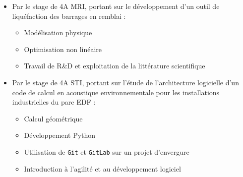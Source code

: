 \begin{itemize}
    \item Par le stage de 4A \gls{MRI}, portant sur le développement d'un outil de liquéfaction des barrages en remblai :
    \begin{itemize}
        \item Modélisation physique
        \item Optimisation non linéaire
        \item Travail de R\&D et exploitation de la littérature scientifique
    \end{itemize}
    \item Par le stage de 4A \gls{STI}, portant sur l'étude de l'architecture logicielle d'un code de calcul en \gls{acoustique} environnementale pour les installations industrielles du parc EDF :
    \begin{itemize}
        \item Calcul géométrique
        \item Développement Python
        \item Utilisation de \texttt{Git} et \texttt{GitLab} sur un projet d'envergure
        \item Introduction à l'agilité et au développement logiciel
    \end{itemize}
\end{itemize}

